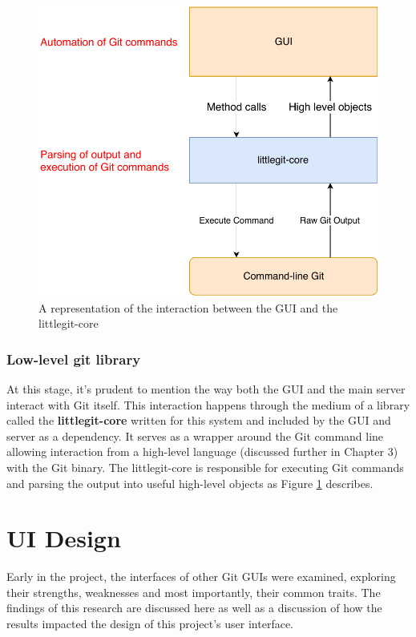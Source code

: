 \begin{figure} 
    \centering
    \includegraphics[scale = 0.5]{figures/gui-core.pdf}
    \caption{A representation of the interaction between the GUI and the littlegit-core }
    \label{fig:gui-layers}
\end{figure}
\subsubsection{ Low-level git library}

At this stage, it's prudent to mention the way both the GUI and the main server interact with Git itself. This interaction happens through the medium of a library called the \textbf{littlegit-core} written for this system and included by the GUI and server as a dependency. It serves as a wrapper around the Git command line allowing interaction from a high-level language (discussed further in Chapter 3) with the Git binary. The littlegit-core is responsible for executing Git commands and parsing the output into useful high-level objects as Figure \ref{fig:gui-layers} describes. 

\section{UI Design}
 
Early in the project, the interfaces of other Git GUIs were examined, exploring their strengths, weaknesses and most importantly, their common traits. The findings of this research are discussed here as well as a discussion of how the results impacted the design of this project's user interface.

